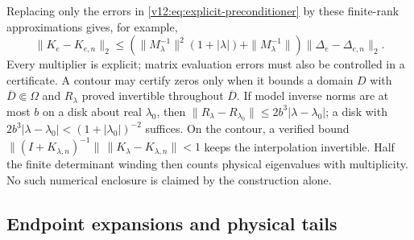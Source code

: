 Replacing only the errors in \eqref{v12:eq:explicit-preconditioner}
by these finite-rank approximations gives, for example,
\[
 \|K_e-K_{e,n}\|_2\le
 (\|M_\lambda^{-1}\|^2(1+|\lambda|)+\|M_\lambda^{-1}\|)
                    \|\Delta_e-\Delta_{e,n}\|_2.
\]
Every multiplier is explicit; matrix evaluation errors must also be
controlled in a certificate.  A contour may certify zeros only when
it bounds a domain $D$ with $\overline D\Subset\Omega$ and
$R_\lambda$ proved invertible throughout $\overline D$.  If model
inverse norms are at most $b$ on a disk about real $\lambda_0$, then
$\|R_\lambda-R_{\lambda_0}\|\le2b^3|\lambda-\lambda_0|$; a disk with
$2b^3|\lambda-\lambda_0|<(1+|\lambda_0|)^{-2}$ suffices.
On the contour, a verified bound
$\|(I+K_{\lambda,n})^{-1}\|\,\|K_\lambda-K_{\lambda,n}\|<1$
keeps the interpolation invertible.  Half the finite determinant winding
then counts physical eigenvalues with multiplicity.  No such numerical
enclosure is claimed by the construction alone.

\subsection{Endpoint expansions and physical tails}

